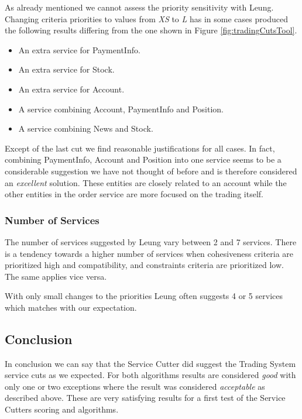 As already mentioned we cannot assess the priority sensitivity with Leung. Changing criteria priorities to values from \textit{XS} to \textit{L} has in some cases produced the following results differing from the one shown in Figure \ref{fig:tradingCutsTool}.

\begin{itemize}
	\item An extra service for PaymentInfo.
	\item An extra service for Stock.
	\item An extra service for Account.
	\item A service combining Account, PaymentInfo and Position.
	\item A service combining News and Stock.
\end{itemize}

Except of the last cut we find reasonable justifications for all cases. In fact, combining PaymentInfo, Account and Position into one service seems to be a considerable suggestion we have not thought of before and is therefore considered an \textit{excellent} solution. These entities are closely related to an account while the other entities in the order service are more focused on the trading itself. 

\subsubsection{Number of Services}

The number of services suggested by Leung vary between 2 and 7 services. There is a tendency towards a higher number of services when cohesiveness criteria are prioritized high and compatibility, and constraints criteria are prioritized low. The same applies vice versa. 

With only small changes to the priorities Leung often suggests 4 or 5 services which matches with our expectation. 

\subsection{Conclusion}

In conclusion we can say that the Service Cutter did suggest the Trading System service cuts as we expected. For both algorithms results are considered \textit{good} with only one or two exceptions where the result was considered \textit{acceptable} as described above. These are very satisfying results for a first test of the Service Cutters scoring and algorithms. 

